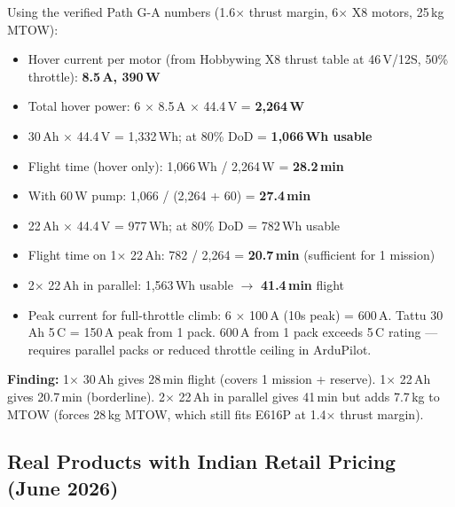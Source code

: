 \documentclass[11pt,a4paper]{article}
\newcommand{\ok} {\textcolor{green!50!black}{\ding{51}}}
\begin{document}
Using the verified Path G-A numbers (1.6$\times$ thrust margin, 6$\times$ X8 motors, 25\,kg MTOW):
\begin{itemize}
  \item Hover current per motor (from Hobbywing X8 thrust table at 46\,V/12S, 50\% throttle): \textbf{8.5\,A, 390\,W}
  \item Total hover power: 6 $\times$ 8.5\,A $\times$ 44.4\,V = \textbf{2,264\,W}
  \item 30\,Ah $\times$ 44.4\,V = 1,332\,Wh; at 80\% DoD = \textbf{1,066\,Wh usable}
  \item Flight time (hover only): 1,066\,Wh / 2,264\,W = \textbf{28.2\,min} \ok{}
  \item With 60\,W pump: 1,066 / (2,264 + 60) = \textbf{27.4\,min}
  \item 22\,Ah $\times$ 44.4\,V = 977\,Wh; at 80\% DoD = 782\,Wh usable
  \item Flight time on 1$\times$ 22\,Ah: 782 / 2,264 = \textbf{20.7\,min} (sufficient for 1 mission)
  \item 2$\times$ 22\,Ah in parallel: 1,563\,Wh usable $\rightarrow$ \textbf{41.4\,min} flight
  \item Peak current for full-throttle climb: 6 $\times$ 100\,A (10s peak) = 600\,A. Tattu 30\,Ah 5\,C = 150\,A peak from 1 pack. 600\,A from 1 pack exceeds 5\,C rating --- requires parallel packs or reduced throttle ceiling in ArduPilot.
\end{itemize}

\textbf{Finding:} 1$\times$ 30\,Ah gives 28\,min flight (covers 1 mission + reserve). 1$\times$ 22\,Ah gives 20.7\,min (borderline). 2$\times$ 22\,Ah in parallel gives 41\,min but adds 7.7\,kg to MTOW (forces 28\,kg MTOW, which still fits E616P at 1.4$\times$ thrust margin).

\subsection{Real Products with Indian Retail Pricing (June 2026)}
\end{document}
